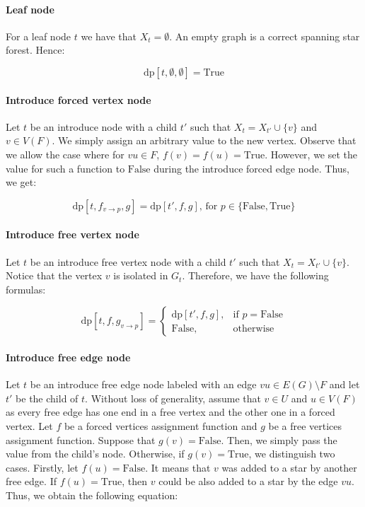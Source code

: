 \documentclass[en]{pracamgr}
\newcommand{\dpt}[1]{\textrm{dp}[#1]}
\newcommand{\true}{\textrm{True}}
\newcommand{\false}{\textrm{False}}
\begin{document}
\paragraph{Leaf node} For a leaf node $t$ we have that $X_t=\emptyset$. An empty graph is a correct spanning star forest. Hence:

\begin{equation*}
	\dpt{t,\emptyset,\emptyset}=\true
\end{equation*}

\paragraph{Introduce forced vertex node} Let $t$ be an introduce node with a child $t'$ such that $X_t = X_{t'} \cup \{v\}$ and $v \in V(F)$. We simply assign an arbitrary value to the new vertex. Observe that we allow the case where for $vu \in F$, $f(v)=f(u)=\true$. However, we set the value for such a function to $\false$ during the introduce forced edge node. Thus, we get:

\begin{equation*}
	\dpt{t,f_{v \rightarrow p},g}= \dpt{t',f,g}\text{, for $p \in \{\false,\true\}$}
\end{equation*}

\paragraph{Introduce free vertex node} Let $t$ be an introduce free vertex node with a child $t'$ such that $X_t = X_{t'} \cup \{v\}$. Notice that the vertex $v$ is isolated in $G_t$. Therefore, we have the following formulas:

\begin{equation*}
	\dpt{t,f,g_{v \rightarrow p}} =
	\begin{cases}
		\dpt{t',f,g}, & \text{if $p=\false$} \\
		\false, &\text{otherwise}
	\end{cases}
\end{equation*}

\paragraph{Introduce free edge node} Let $t$ be an introduce free edge node labeled with an edge $vu \in E(G) \setminus F$ and let $t'$ be the child of $t$. Without loss of generality, assume that $v \in U$ and $u \in V(F)$ as every free edge has one end in a free vertex and the other one in a forced vertex. Let $f$ be a forced vertices assignment function and $g$ be a free vertices assignment function. Suppose that $g(v)=\false$. Then, we simply pass the value from the child's node. Otherwise, if $g(v)=\true$, we distinguish two cases. Firstly, let $f(u)=\false$. It means that $v$ was added to a star by another free edge. If $f(u)=\true$, then $v$ could be also added to a star by the edge $vu$. Thus, we obtain the following equation: 
\end{document}
